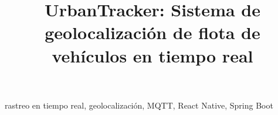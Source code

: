 \documentclass[conference]{IEEEtran}
\begin{document}
\title{UrbanTracker: Sistema de geolocalización de flota de vehículos en tiempo real}

\author{
}

\maketitle

\begin{abstract}

\end{abstract}

\begin{IEEEkeywords}
rastreo en tiempo real, geolocalización, MQTT, React Native, Spring Boot
\end{IEEEkeywords}










\printbibliography
\end{document}

